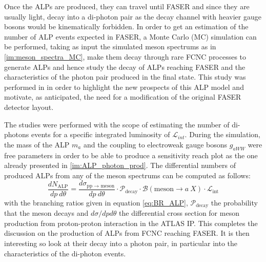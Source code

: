 		Once the ALPs are produced, they can travel until FASER and since they are usually light, decay into a di-photon pair as the decay channel with heavier gauge bosons would be kinematically forbidden. In order to get an estimation of the number of ALP events expected in FASER, a Monte Carlo (MC) simulation can be performed, taking as input the simulated meson spectrums as in \ref{im:meson_spectra_MC}, make them decay through rare FCNC processes to generate ALPs and hence study the decay of ALPs reaching FASER and the characteristics of the photon pair produced in the final state. This study was performed in \cite{Moretti_MasterThesis} in order to highlight the new prospects of this ALP model and motivate, as anticipated, the need for a modification of the original FASER detector layout.     
		
		The studies were performed with the scope of estimating the number of di-photons events for a specific integrated luminosity of $\mathcal{L}_{int}$. During the simulation, the mass of the ALP $m_a$ and the coupling to electroweak gauge bosons $g_{aWW}$ were free parameters in order to be able to produce a sensitivity reach plot as the one already presented in \ref{im:ALP_photon_prod}. The differential numbers of produced ALPs from any of the meson spectrums can be computed as follows: 
		\begin{equation}
			\frac{dN_{\text{ALP}}}{dp~d\theta} =  \frac{d\sigma_{\text{pp $\rightarrow$ meson}}}{dp~d\theta} \cdot \mathcal{P}_{\text{decay}} \cdot \mathcal{B}(\text{meson} \rightarrow a~X) \cdot \mathcal{L}_{\text{int}}
		\end{equation}
		with the branching ratios given in equation \ref{eq:BR_ALP}, $\mathcal{P}_{\text{decay}}$ the probability that the meson decays and $d\sigma/dpd\theta$ the differential cross section for meson production from proton-proton interaction in the ATLAS IP. This completes the discussion on the production of ALPs from FCNC reaching FASER. It is then interesting so look at their decay into a photon pair, in particular into the characteristics of the di-photon events.  
		
